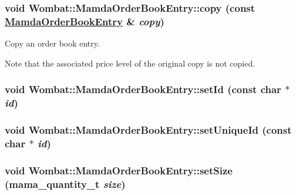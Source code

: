 \hypertarget{classWombat_1_1MamdaOrderBookEntry_ddda14d720fdf2813216321603aa71c2}{
\subsubsection[copy]{\setlength{\rightskip}{0pt plus 5cm}void Wombat::Mamda\-Order\-Book\-Entry::copy (const \hyperlink{classWombat_1_1MamdaOrderBookEntry}{Mamda\-Order\-Book\-Entry} \& {\em copy})}}
\label{classWombat_1_1MamdaOrderBookEntry_ddda14d720fdf2813216321603aa71c2}


Copy an order book entry. 

Note that the associated price level of the original copy is not copied. \hypertarget{classWombat_1_1MamdaOrderBookEntry_9625d949cdf4904dc40c98c937b738fc}{
\subsubsection[setId]{\setlength{\rightskip}{0pt plus 5cm}void Wombat::Mamda\-Order\-Book\-Entry::set\-Id (const char $\ast$ {\em id})}}
\label{classWombat_1_1MamdaOrderBookEntry_9625d949cdf4904dc40c98c937b738fc}


\hypertarget{classWombat_1_1MamdaOrderBookEntry_e3315def6ef4641b52b5fd1ec4581c11}{
\subsubsection[setUniqueId]{\setlength{\rightskip}{0pt plus 5cm}void Wombat::Mamda\-Order\-Book\-Entry::set\-Unique\-Id (const char $\ast$ {\em id})}}
\label{classWombat_1_1MamdaOrderBookEntry_e3315def6ef4641b52b5fd1ec4581c11}


\hypertarget{classWombat_1_1MamdaOrderBookEntry_0520962406e35793f0925845ff32791f}{
\subsubsection[setSize]{\setlength{\rightskip}{0pt plus 5cm}void Wombat::Mamda\-Order\-Book\-Entry::set\-Size (mama\_\-quantity\_\-t {\em size})}}
\label{classWombat_1_1MamdaOrderBookEntry_0520962406e35793f0925845ff32791f}


